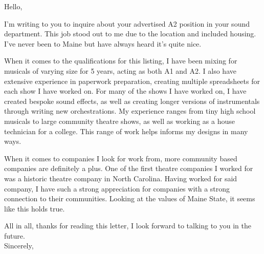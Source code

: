 \documentclass[12pt]{article}
\begin{document}
   
    Hello,
    \par I'm writing to you to inquire about your advertised A2 position in your sound department.
    This job stood out to me due to the location and included housing. I've never been to Maine but have always heard it's quite nice.
    \par When it comes to the qualifications for this listing, I have been mixing for musicals of varying size for 5 years, acting as both A1 and A2.
    I also have extensive experience in paperwork preparation, creating multiple spreadsheets for each show I have worked on. 
    For many of the shows I have worked on, I have created bespoke sound effects, as well as creating longer versions of instrumentals through writing new orchestrations.
    My experience ranges from tiny high school musicals to large community theatre shows, as well as working as a house technician for a college. This range of work helps informs my designs in many ways.
    \par When it comes to companies I look for work from, more community based companies are definitely a plus. One of the first theatre companies I worked for was a historic theatre company in North Carolina.
    Having worked for said company, I have such a strong appreciation for companies with a strong connection to their communities. Looking at the values of Maine State, it seems like this holds true.
    \par All in all, thanks for reading this letter, I look forward to talking to you in the future.\\
    Sincerely,
\end{document}
